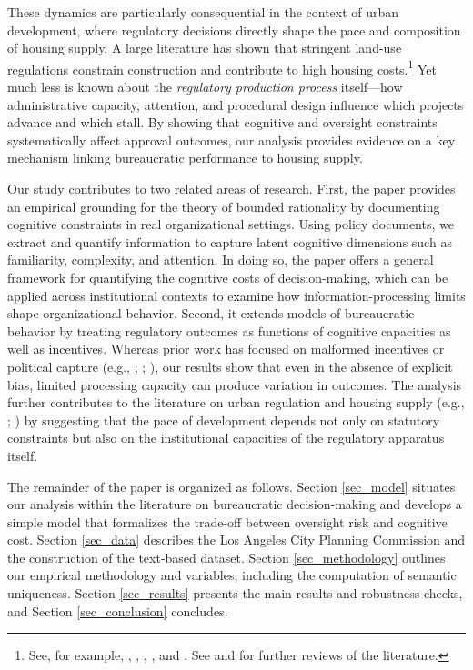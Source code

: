 These dynamics are particularly consequential in the context of urban development, where regulatory decisions directly shape the pace and composition of housing supply. A large literature has shown that stringent land-use regulations constrain construction and contribute to high housing costs.\footnote{See, for example, 
\citet{glaeser2009},
\citet{hilber2016},
\citet{ganongshoag2017},
\citet{brueckner2020},
and \citet{gabrielkung2025}.
See \citet{gyourkomolloy2015} and \citet{molloy2020} 
for further reviews of the literature.} 
Yet much less is known about the \emph{regulatory production process} itself---how administrative capacity, attention, and procedural design influence which projects advance and which stall. By showing that cognitive and oversight constraints systematically affect approval outcomes, our analysis provides evidence on a key mechanism linking bureaucratic performance to housing supply.

Our study contributes to two related areas of research. First, the paper provides an empirical grounding for the theory of bounded rationality by documenting cognitive constraints in real organizational settings. Using policy documents, we extract and quantify information to capture latent cognitive dimensions such as familiarity, complexity, and attention. In doing so, the paper offers a general framework for quantifying the cognitive costs of decision-making, which can be applied across institutional contexts to examine how information-processing limits shape organizational behavior. Second, it extends models of bureaucratic behavior by treating regulatory outcomes as functions of cognitive capacities as well as incentives. Whereas prior work has focused on malformed incentives or political capture (e.g., \citealp{Prendergast2003}; \citealp{CarpenterKrause2012}; \citealp{BusuiocLodge2016}), our results show that even in the absence of explicit bias, limited processing capacity can produce variation in outcomes. The analysis further contributes to the literature on urban regulation and housing supply (e.g., \citealp{gyourkomolloy2015}; \citealp{molloy2020}) by suggesting that the pace of development depends not only on statutory constraints but also on the institutional capacities of the regulatory apparatus itself.

The remainder of the paper is organized as follows. Section \ref{sec_model} situates our analysis within the literature on bureaucratic decision-making and develops a simple model that formalizes the trade-off between oversight risk and cognitive cost. Section \ref{sec_data} describes the Los Angeles City Planning Commission and the construction of the text-based dataset. Section \ref{sec_methodology} outlines our empirical methodology and variables, including the computation of semantic uniqueness. Section \ref{sec_results} presents the main results and robustness checks, and Section \ref{sec_conclusion} concludes.